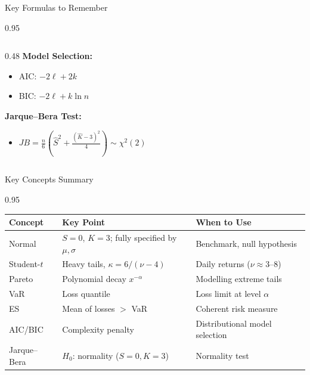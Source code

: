 \documentclass[9pt, aspectratio=169, t]{beamer}
\begin{document}
\begin{frame}{Key Formulas to Remember}
\begin{cminipage}{0.95\textwidth}
\begin{columns}[T]
\begin{column}{0.48\textwidth}
            \textbf{Model Selection:}
            \begin{itemize}\setlength{\itemsep}{0pt}
                \item AIC: $-2\ell + 2k$
                \item BIC: $-2\ell + k\ln n$
            \end{itemize}

            \vspace{0.3cm}

            \textbf{Jarque--Bera Test:}
            \begin{itemize}\setlength{\itemsep}{0pt}
                \item $JB = \frac{n}{6}\left(\hat{S}^2 + \frac{(\hat{K}-3)^2}{4}\right) \sim \chi^2(2)$
            \end{itemize}
        \end{column}
    \end{columns}
\end{cminipage}
\end{frame}

\begin{frame}{Key Concepts Summary}
\begin{cminipage}{0.95\textwidth}
    \begin{center}
    \small
    \begin{tabular}{lll}
        \toprule
        \textbf{Concept} & \textbf{Key Point} & \textbf{When to Use} \\
        \midrule
        Normal & $S=0$, $K=3$; fully specified by $\mu, \sigma$ & Benchmark, null hypothesis \\
        Student-$t$ & Heavy tails, $\kappa = 6/(\nu-4)$ & Daily returns ($\nu \approx 3$--$8$) \\
        Pareto & Polynomial decay $x^{-\alpha}$ & Modelling extreme tails \\
        \midrule
        VaR & Loss quantile & Loss limit at level $\alpha$ \\
        ES & Mean of losses $>$ VaR & Coherent risk measure \\
        \midrule
        AIC/BIC & Complexity penalty & Distributional model selection \\
        Jarque--Bera & $H_0$: normality ($S=0, K=3$) & Normality test \\
        \bottomrule
    \end{tabular}
    \end{center}
\end{cminipage}
\end{frame}
\end{document}
